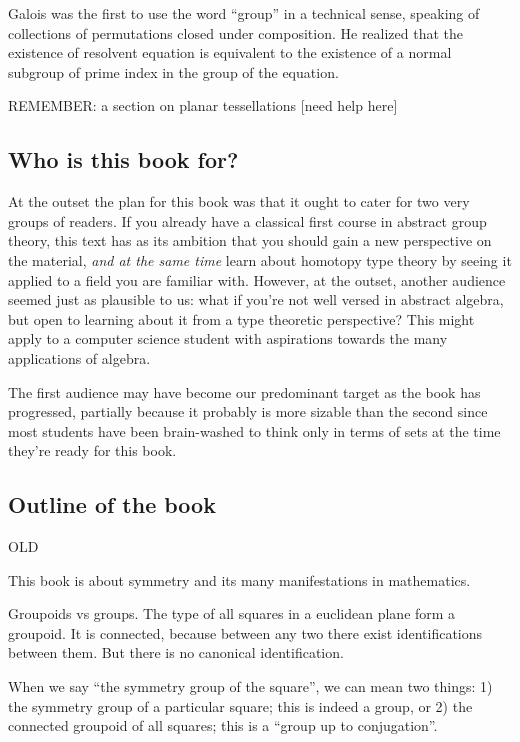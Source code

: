 Galois was the first to use the word ``group'' in a technical sense,
speaking of collections of permutations closed under composition.
He realized that the existence of resolvent equation is equivalent
to the existence of a normal subgroup of prime index
in the group of the equation.


REMEMBER: a section on planar tessellations [need help here]


\subsection{Who is this book for?}
\label{sec:who}
At the outset the plan for this book was that it ought to cater for two very groups of readers. If you already have a classical first course in abstract group theory, this text has as its ambition that you should gain a new perspective on the material, \emph{and at the same time} learn about homotopy type theory by seeing it applied to a field you are familiar with. However, at the outset, another audience seemed just as plausible to us: what if you're not well versed in abstract algebra, but open to learning about it from a type theoretic perspective? This might apply to a computer science student with aspirations towards the many applications of algebra.

The first audience may have become our predominant target as the book has progressed, partially because it probably is more sizable than the second since most students have been brain-washed to think only in terms of sets at the time they're ready for this book.

\subsection{Outline of the book}
\label{sec:outline}

%






OLD

This book is about symmetry and its many manifestations in mathematics.

Groupoids vs groups.
The type of all squares in a euclidean plane form a groupoid.
It is connected,
because between any two there exist identifications between them.
But there is no canonical identification.

When we say ``the symmetry group of the square'',
we can mean two things:
1) the symmetry group of a particular square;
this is indeed a group,
or 2) the connected groupoid of all squares;
this is a ``group up to conjugation''.

